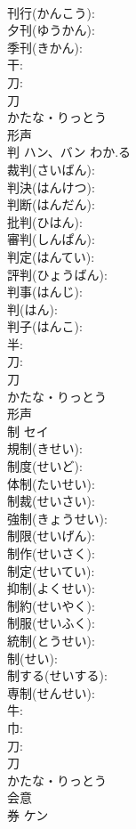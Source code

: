 \documentclass[8pt]{extreport}
\begin{document}
\begin{CJK}{UTF8}{min}
\\	刊行(かんこう): 
\\	夕刊(ゆうかん): 
\\	季刊(きかん): 
\\	干: 
\\	刀: 
\\	刀	
\\	かたな・りっとう	
\\	形声 
\\	判	ハン、バン	わか.る		
\\	裁判(さいばん): 
\\	判決(はんけつ): 
\\	判断(はんだん): 
\\	批判(ひはん): 
\\	審判(しんぱん): 
\\	判定(はんてい): 
\\	評判(ひょうばん): 
\\	判事(はんじ): 
\\	判(はん): 
\\	判子(はんこ): 
\\	半: 
\\	刀: 
\\	刀	
\\	かたな・りっとう	
\\	形声 
\\	制	セイ			
\\	規制(きせい): 
\\	制度(せいど): 
\\	体制(たいせい): 
\\	制裁(せいさい): 
\\	強制(きょうせい): 
\\	制限(せいげん): 
\\	制作(せいさく): 
\\	制定(せいてい): 
\\	抑制(よくせい): 
\\	制約(せいやく): 
\\	制服(せいふく): 
\\	統制(とうせい): 
\\	制(せい): 
\\	制する(せいする): 
\\	専制(せんせい): 
\\	牛: 
\\	巾: 
\\	刀: 
\\	刀	
\\	かたな・りっとう	
\\	会意 
\\	券	ケン			

\end{CJK}
\end{document}
